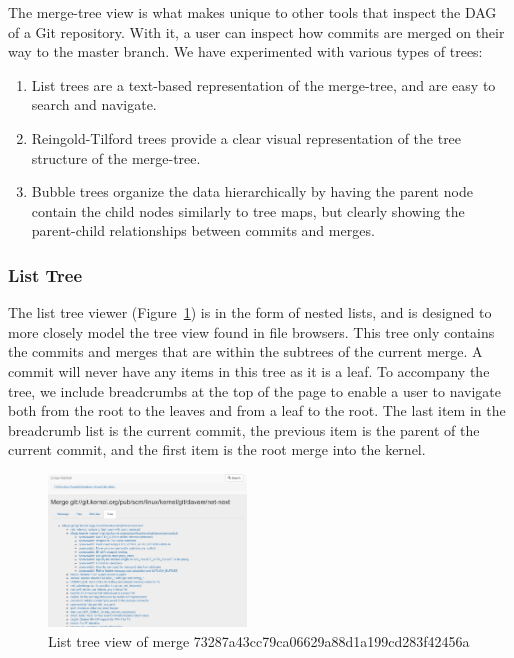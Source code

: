 \documentclass[conference, draftclsnofoot, draft]{IEEEtran}
\begin{document}
The merge-tree view is what makes \tool unique to other tools that inspect the DAG
of a Git repository. With it, a user can inspect how commits are merged on their way
to the master branch. We have experimented with various types of trees:

\begin{enumerate}
        \item List trees are a text-based representation of the merge-tree, and are easy to search and navigate.
        \item Reingold-Tilford trees provide a clear visual representation of the tree structure of the merge-tree.
        \item Bubble trees organize the data hierarchically by having the parent node contain the child nodes similarly to tree maps, but
                clearly showing the parent-child relationships between commits and merges.
\end{enumerate}


\subsubsection{List Tree}

The list tree viewer (Figure~\ref{fig:list_tree}) is in the form of nested lists,
and is designed to more closely model the tree view found in file browsers. This
tree only contains the commits and merges that are within the subtrees of the
current merge. A commit will never have any items in this tree as it is a leaf. To
accompany the tree, we include breadcrumbs at the top of the page to enable a user
to navigate both from the root to the leaves and from a leaf to the root. The last
item in the breadcrumb list is the current commit, the previous item is the parent
of the current commit, and the first item is the root merge into the kernel.

\begin{figure}
        \centering
        \includegraphics[width=0.47\textwidth]{figures/list_tree.png}
        \caption{List tree view of merge 73287a43cc79ca06629a88d1a199cd283f42456a}
        \label{fig:list_tree}
\end{figure}
\end{document}
